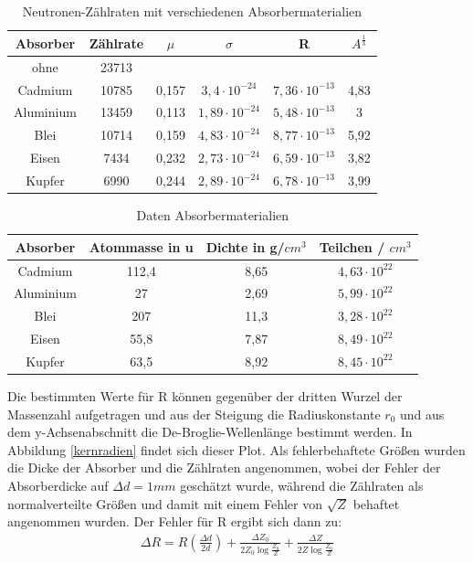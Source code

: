 \begin{table}[h]
	\caption{Neutronen-Zählraten mit verschiedenen Absorbermaterialien}
	\begin{tabular}{|c|c|c|c|c|c|}
	\hline
	 Absorber & Zählrate & $\mu$ & $\sigma$ & R & $A^\frac{1}{3}$ \\ \hline
	  ohne & 23713 &  &  &  &   \\ \hline
	   Cadmium & 10785  & 0,157 & $3,4\cdot 10^{-24}$ & $7,36 \cdot 10^{-13}$ & 4,83\\ \hline
	    Aluminium & 13459 & 0,113 & $1,89\cdot 10^{-24}$ & $5,48 \cdot 10^{-13}$  & 3 \\ \hline
	     Blei & 10714  & 0,159 & $4,83\cdot 10^{-24}$ & $8,77 \cdot 10^{-13}$  & 5,92 \\ \hline
	      Eisen & 7434  & 0,232 & $2,73\cdot 10^{-24}$ & $6,59 \cdot 10^{-13}$  & 3,82 \\ \hline
	       Kupfer & 6990 & 0,244 & $2,89\cdot 10^{-24}$ & $6,78 \cdot 10^{-13}$  & 3,99\\ \hline
	\end{tabular}
\label{werte}
\end{table}

\begin{table}[h]
	\caption{Daten Absorbermaterialien}
	\begin{tabular}{|c|c|c|c|}
	\hline
	 Absorber & Atommasse in u & Dichte in g/$cm^3$ & Teilchen / $cm^3$ \\ \hline
	   Cadmium & 112,4  & 8,65 & $4,63 \cdot 10^{22}$ \\ \hline
	    Aluminium & 27 & 2,69 & $5,99 \cdot 10^{22}$ \\ \hline
	     Blei & 207  & 11,3 & $3,28 \cdot 10^{22}$  \\ \hline
	      Eisen & 55,8  & 7,87 & $8,49 \cdot 10^{22}$ \\ \hline
	       Kupfer & 63,5 & 8,92 & $8,45 \cdot 10^{22}$ \\ \hline
	\end{tabular}
\label{werte2}
\end{table}

Die bestimmten Werte für R können gegenüber der dritten Wurzel der Massenzahl aufgetragen und aus der Steigung die Radiuskonstante $r_0$ und aus dem y-Achsenabschnitt die De-Broglie-Wellenlänge bestimmt werden. In Abbildung \ref{kernradien} findet sich dieser Plot. Als fehlerbehaftete Größen wurden die Dicke der Absorber und die Zählraten angenommen, wobei der Fehler der Absorberdicke auf $\Delta d = 1mm$ geschätzt wurde, während die Zählraten als normalverteilte Größen und damit mit einem Fehler von $\sqrt{Z}$ behaftet angenommen wurden. Der Fehler für R ergibt sich dann zu:
\begin{align} 
\Delta R = R \left(\frac{\Delta d}{2d}\right) + \frac{\Delta Z_0}{2Z_0\log\frac{Z_0}{Z}}+\frac{\Delta Z}{2Z\log\frac{Z_0}{Z}}
\end{align}


